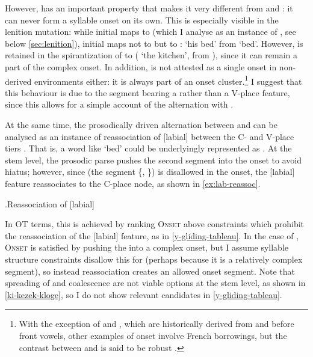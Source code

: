However, \ipa{[ɥ]} has an important property that makes it very different from \ipa{[w]} and \ipa{[j]}: it can never form a syllable onset on its own. This is especially visible in the lenition mutation: while initial \ipa{[ɡw]} maps to \ipa{[w]} (which I analyse as an instance of \ipa{[u]}, see below \cref{sec:lenition}), initial \ipa{[dʒɥ]} maps not to \ipa{[ɥ]} but to \ipa{[v]}: \ipa{[i ˈveːle]} `his bed' from \ipa{[dʒɥeːle]} `bed'. However, \ipa{[ɥ]} is retained in the spirantization of \ipa{[ʧɥ]} to \ipa{[hɥ]} (\ipa{[ə ˈhɥiːzin]} `the kitchen', from \ipa{[ˈʧɥiːzin]}), since it can remain a part of the complex onset. In addition, \ipa{[ɥ]} is not attested as a single onset in non-derived environments either: it is always part of an onset cluster.\footnote{With the exception of \ipa{[ʧɥ]} and \ipa{[dʒɥ]}, which are historically derived from \ipa{[kw]} and \ipa{[ɡw]} before front vowels, other examples of onset \ipa{[ɥ]} involve French borrowings, but the contrast between \ipa{[w]} and \ipa{[ɥ]} is said to be robust \citep[p.~167]{humphreys95:_phonol_bothoa_saint_nicol_pelem}.} I suggest that this behaviour is due to the segment \ipa{[ɥ]} bearing a  rather than a V-place feature, since this allows for a simple account of the alternation with \ipa{[v]}.

At the same time, the prosodically driven alternation between  \ipa{[ɥ]} and \ipa{[y]} can be analysed as an instance of reassociation of [labial] between the C- and V-place tiers \citep{clements91:_place,youssef11:_labial_baghd_arabic}. That is, a word like \ipa{[ˈdʒɥeːle]} `bed' could be underlyingly represented as . At the stem level, the prosodic parse pushes the second segment into the onset to avoid hiatus; however, since \ipa{[y]} (the segment \{, \}) is disallowed in the onset, the [labial] feature reassociates to the C-place node, as shown in \ref{ex:lab-reassoc}.

\ex.\label{ex:lab-reassoc}Reassociation of [labial]\\

In OT terms, this is achieved by ranking \textsc{Onset} above constraints which prohibit the reassociation of the [labial] feature, as in \ref{y-gliding-tableau}. In the case of \ipa{[i]}, \textsc{Onset} is satisfied by pushing the  into a complex onset, but I assume syllable structure constraints disallow this for \ipa{[y]} (perhaps because it is a relatively complex segment), so instead reassociation creates an allowed onset segment. Note that spreading of  and coalescence are not viable options at the stem level, as shown in \ref{ki-kezek-kloge}, so I do not show relevant candidates in \cref{y-gliding-tableau}.


